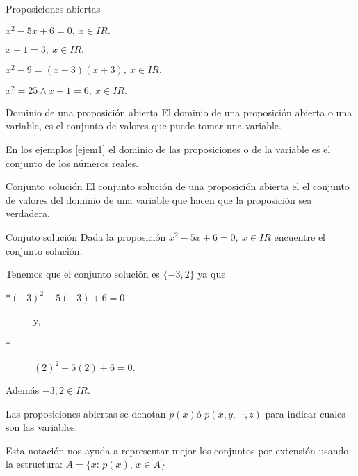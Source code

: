 \begin{ejems}{Proposiciones abiertas}\begin{lista}\label{ejem1}

\item $x^{2}-5x+6=0,\: x\in I\!\! R.$

\item $x+1=3,\: x\in I\!\! R.$

\item $x^{2}-9=\left(x-3\right)\left(x+3\right),\: x\in I\!\! R.$

\item $x^{2}=25\wedge x+1=6,\: x\in I\!\! R.$

\end{lista}

\end{ejems}

\begin{definicionn}{Dominio de una proposición abierta} El dominio
de una proposición abierta o una variable, es el conjunto de valores
que puede tomar una variable.\end{definicionn}

En los ejemplos \ref{ejem1} el dominio de las proposiciones o de
la variable es el conjunto de los números reales.

\begin{definicionn}{Conjunto solución} El conjunto solución de una
proposición abierta el el conjunto de valores del dominio de una variable
que hacen que la proposición sea verdadera.\end{definicionn}

\begin{ejem}{Conjuto solución} Dada la proposición \foreignlanguage{english}{$x^{2}-5x+6=0,\: x\in I\!\! R$}
encuentre el conjunto solución. \end{ejem}

\solucion Tenemos que el conjunto solución es $\{-3,2\}$ ya que
\begin{description}
\item [{{*}$\left(-3\right)^{2}-5\left(-3\right)+6=0$}] y,
\item [{{*}}] $\left(2\right)^{2}-5\left(2\right)+6=0.$
\end{description}
Además $-3,2\in I\!\! R.$

\notacion Las proposiciones abiertas se denotan $p\left(x\right)$ó
$p(x,y,\cdots,z)$ para indicar cuales son las variables.

Esta notación nos ayuda a representar mejor los conjuntos por extensión
usando la estructura: $A=\{x:\, p(x),\, x\in A\}$

